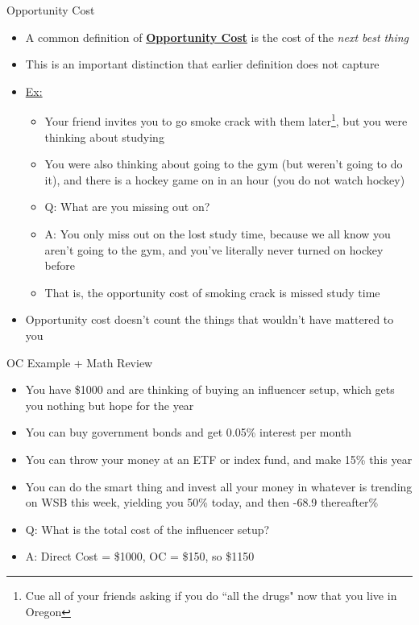\documentclass[10pt,xcolor={svgnames}]{beamer}
\begin{document}
\begin{frame}{Opportunity Cost}
\begin{itemize}[<+->]
    \item A common definition of \underline{\textbf{Opportunity Cost}} is the cost of the \textit{next best thing}
    \item This is an important distinction that earlier definition does not capture
    \item \underline{Ex:} 
    \begin{itemize}
        \item<3-> Your friend invites you to go smoke crack with them later\footnote{Cue all of your friends asking if you do ``all the drugs" now that you live in Oregon}, but you were thinking about studying 
        \item<3-> You were also thinking about going to the gym (but weren't going to do it), and there is a hockey game on in an hour (you do not watch hockey)
        \item<3-> Q: What are you missing out on?
        \item<4-> A: You only miss out on the lost study time, because we all know you aren't going to the gym, and you've literally never turned on hockey before
        \item<5-> That is, the opportunity cost of smoking crack is missed study time
    \end{itemize}
    \item Opportunity cost doesn't count the things that wouldn't have mattered to you
\end{itemize}
\end{frame}



\begin{frame}{OC Example + Math Review}
\begin{itemize}[<+->]
    \item You have \$1000 and are thinking of buying an influencer setup, which gets you nothing but hope for the year
    \item You can buy government bonds and get 0.05\% interest per month
    \item You can throw your money at an ETF or index fund, and make 15\% this year
    \item You can do the smart thing and invest all your money in whatever is trending on WSB this week, yielding you 50\% today, and then -68.9 thereafter\%
    \item Q: What is the total cost of the influencer setup?\vspace{7mm}
    \item A: Direct Cost = \$1000, OC = \$150, so \$1150
\end{itemize}
\end{frame}
\end{document}
